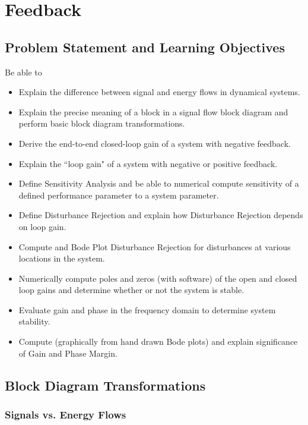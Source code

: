 %
%
%

\chapter{Feedback}\label{FeedbackChapter}

\section{Problem Statement and Learning Objectives}
Be able to

\begin{itemize}
    \item Explain the difference between signal and energy flows in dynamical systems.
    \item Explain the precise meaning of a block in a signal flow block diagram and 
    perform basic block diagram transformations. 
    \item  Derive the end-to-end closed-loop gain of a system with negative feedback. 
    \item Explain the ``loop gain" of a system with negative or positive feedback. 
    \item Define Sensitivity Analysis and be able to numerical compute sensitivity of 
    a defined performance parameter to a system parameter.
    \item Define Disturbance Rejection and explain how Disturbance Rejection depends on 
    loop gain. 
    \item Compute and Bode Plot  Disturbance Rejection for disturbances at various locations in the system. 
    \item Numerically compute poles and zeros (with software) of the open and closed loop gains and determine whether or not the system is stable. 
    \item Evaluate gain and phase in the frequency domain to determine system stability. 
    \item Compute (graphically from hand drawn Bode plots) and explain significance of Gain and Phase Margin. 
\end{itemize}

\section{Block Diagram Transformations}

\subsection{Signals vs. Energy Flows}

